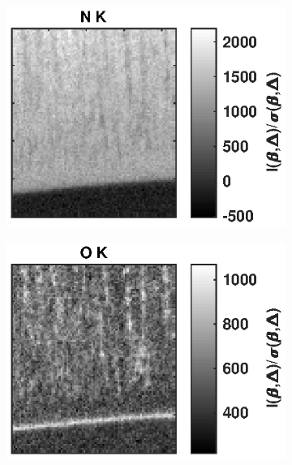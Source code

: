 \documentclass[%
 aip,
rsi,%
 amsmath,amssymb,
 reprint,%
]{revtex4-1}
\begin{document}
\begin{figure}
	\begin{subfigure}{0.3\textwidth}
    	\includegraphics[width=\textwidth]{qNMap}
        \subcaption{}
        \label{fig:qNMap}
    \end{subfigure}
    \begin{subfigure}{0.3\textwidth}
    	\includegraphics[width=\textwidth]{qOMap}
        \subcaption{}
        \label{fig:qOMap}
    \end{subfigure}
    \begin{subfigure}{0.3\textwidth}

\end{subfigure}
\end{figure}
\end{document}
